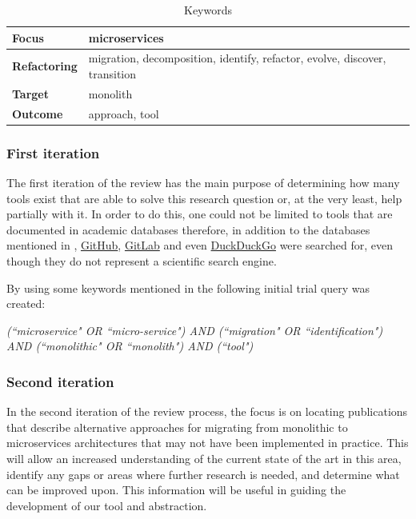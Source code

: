 \documentclass[conference]{IEEEtran}
\begin{document}
\begin{table}[!htb] \caption{Keywords} \label{tab:keywords}
  \begin{center}
    \begin{tabular}[c]{p{7em}|p{13em}} {\textbf{Focus}} & microservices \\
      \hline \textbf{Refactoring} & {migration, decomposition, identify, refactor, evolve, discover, transition } \\
      \hline \textbf{Target} & monolith \\
      \hline \textbf{Outcome} & approach, tool \\
    \end{tabular}
  \end{center}
\end{table}

\subsubsection*{First iteration} \label{subsub:first-iteration}

The first iteration of the review has the main purpose of determining how many
tools exist that are able to solve this research question or, at the very
least, help partially with it. In order to do this, one could not be limited to
tools that are documented in academic databases therefore, in addition to the
databases mentioned in ,
\href{https://github.com}{GitHub}, \href{https://gitlab.com}{GitLab} and even
\href{https://duckduckgo.org}{DuckDuckGo} were searched for, even though they
do not represent a scientific search engine.

By using some keywords mentioned in  the following
initial trial query was created:

\begin{center}
  \emph{(``microservice" OR ``micro-service") AND (``migration" OR
  ``identification") AND (``monolithic" OR ``monolith") AND (``tool")}
\end{center}

\subsubsection*{Second iteration} \label{subsub:second-iteration}

In the second iteration of the review process, the focus is on locating
publications that describe alternative approaches for migrating from monolithic
to microservices architectures that may not have been implemented in practice.
This will allow an increased understanding of the current state of the art in
this area, identify any gaps or areas where further research is needed, and
determine what can be improved upon. This information will be useful in guiding
the development of our tool and abstraction.
\end{document}
